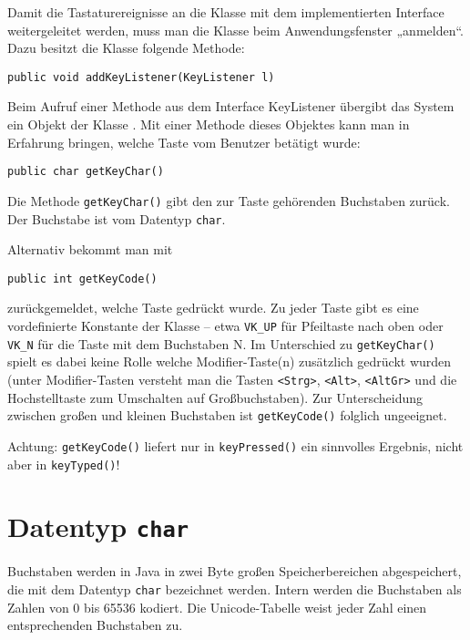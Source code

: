 Damit die Tastaturereignisse an die Klasse mit dem implementierten Interface
weitergeleitet werden, muss man die Klasse beim Anwendungsfenster „anmelden“.
Dazu besitzt die Klasse  folgende Methode:

\begin{lstlisting}
public void addKeyListener(KeyListener l)
\end{lstlisting}

Beim Aufruf einer Methode aus dem Interface KeyListener übergibt das System ein
Objekt der Klasse . Mit einer Methode dieses Objektes kann man
in Erfahrung bringen, welche Taste vom Benutzer betätigt wurde:

\begin{lstlisting}
public char getKeyChar() 
\end{lstlisting}

Die Methode \lstinline|getKeyChar()| gibt den zur Taste gehörenden Buchstaben
zurück. Der Buchstabe ist vom Datentyp \lstinline|char|.

Alternativ bekommt man mit

\begin{lstlisting}
public int getKeyCode() 

\end{lstlisting}

zurückgemeldet, welche Taste gedrückt wurde. Zu jeder Taste gibt es eine
vordefinierte Konstante der Klasse  – etwa \lstinline|VK_UP|
für Pfeiltaste nach oben oder \lstinline|VK_N| für die Taste mit dem Buchstaben
N. Im Unterschied zu \lstinline|getKeyChar()| spielt es dabei keine Rolle welche
Modifier-Taste(n) zusätzlich gedrückt wurden (unter Modifier-Tasten versteht man
die Tasten \lstinline|<Strg>|, \lstinline|<Alt>|, \lstinline|<AltGr>| und die
Hochstelltaste zum Umschalten auf Großbuchstaben). Zur Unterscheidung zwischen
großen und kleinen Buchstaben ist \lstinline|getKeyCode()| folglich ungeeignet.

Achtung: \lstinline|getKeyCode()| liefert nur in \lstinline|keyPressed()| ein
sinnvolles Ergebnis, nicht aber in \lstinline|keyTyped()|!

\section{Datentyp \lstinline|char|}

Buchstaben werden in Java in zwei Byte großen Speicherbereichen abgespeichert,
die mit dem Datentyp \lstinline|char| bezeichnet werden. Intern werden die
Buchstaben als Zahlen von 0 bis 65536 kodiert. Die Unicode-Tabelle weist jeder
Zahl einen entsprechenden Buchstaben zu.

